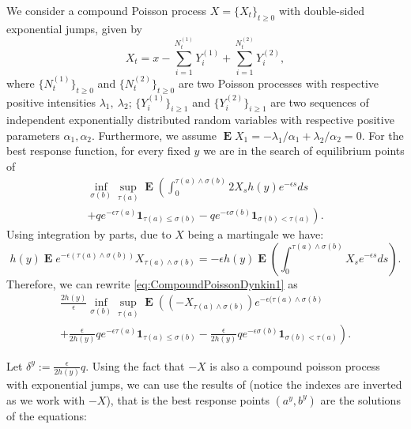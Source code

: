 \documentclass{article}
\newcommand\E{\operatorname{\mathbf{E}}}
\begin{document}
We consider a compound Poisson process $X=\{X_t\}_{t\geq 0}$ with double-sided exponential jumps, given by
%
\begin{equation*}
X_t=x-\sum_{i=1}^{N^{(1)}_t}Y^{(1)}_i+\sum_{i=1}^{N^{(2)}_t}Y^{(2)}_i,
\end{equation*}
where $\{N^{(1)}_t\}_{t\geq 0}$ and 
$\{N^{(2)}_t\}_{t\geq 0}$ 
are two Poisson processes with respective positive intensities $\lambda_1, \ \lambda_2$;
$\{Y^{(1)}_i\}_{i\geq 1}$ and $\{Y^{(2)}_i\}_{i\geq 1}$ 
are two sequences of independent exponentially distributed random variables with respective positive parameters 
$\alpha_1,\alpha_2$. Furthermore, we assume $\E X_1=-\lambda_1/\alpha_1 +\lambda_2/\alpha_2=0$. For the best response function, for every fixed $y$ we are in the search of equilibrium points of
\begin{multline}\label{eq:CompoundPoissonDynkin1}
\inf_{\sigma(b)}\sup_{\tau(a)}\E   \left(\int_0^{\tau(a) \wedge \sigma(b)}  2X_s h(y) e^{-\epsilon s}ds \right. \\ \left.  +q e^{-\epsilon \tau(a)} \mathbf{1}_{\tau(a) \leq \sigma(b) }  
     -q e^{-\epsilon \sigma(b)} \mathbf{1}_{\sigma(b) <\tau(a)}   \right). 
\end{multline}
Using integration by parts, due to $X$ being a martingale we have:
$$h(y)\E e^{-\epsilon (\tau(a) \wedge \sigma(b))}X_{\tau(a)\wedge \sigma(b)}=-\epsilon h(y) \E \left(\int_0^{\tau(a)\wedge \sigma(b)}X_s e^{-\epsilon s}ds \right). $$
Therefore, we can rewrite \eqref{eq:CompoundPoissonDynkin1} as 
\begin{multline}\label{eq:CompoundPoissonDynkin2}
\frac{2h(y)}{\epsilon}\inf_{\sigma(b)}\sup_{\tau(a)}\E   \left(   (-X_{\tau(a)\wedge \sigma(b)})  e^{-\epsilon (\tau(a)\wedge \sigma(b)} \right. \\ \left. +\frac{\epsilon}{2h(y)} q  e^{-\epsilon \tau(a)} \mathbf{1}_{\tau(a) \leq \sigma(b) }  
     -\frac{\epsilon}{2h(y)} q e^{-\epsilon \sigma(b)} \mathbf{1}_{\sigma(b) <\tau(a)}   \right). 
\end{multline}

Let $\delta^y:=\frac{\epsilon}{2h(y)} q$. Using the fact that $-X$ is also a compound poisson process with exponential jumps, we can use the results of \cite{ASPISOSADECKI} (notice the indexes are inverted as we work with $-X$), that is the best response points $(a^y, b^y )$ are the solutions of the equations:
\end{document}
